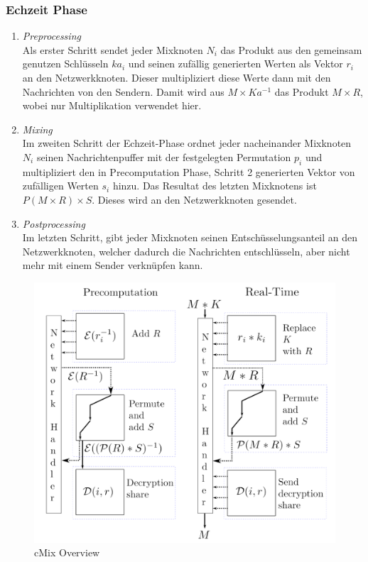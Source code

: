 \documentclass[
    fontsize=12pt,
    headings=small,
    parskip=half,           %
    bibliography=totoc,
    numbers=noenddot,       %
    open=any,               %
    ]{scrreprt}
\begin{document}
\subsubsection{Echzeit Phase}
\begin{enumerate}
	\item \textit{Preprocessing} \\
	Als erster Schritt sendet jeder Mixknoten $N_i$ das Produkt aus den gemeinsam genutzen Schlüsseln $ka_i$ und seinen zufällig generierten Werten als Vektor $r_i$ an den Netzwerkknoten.
Dieser multipliziert diese Werte dann mit den Nachrichten von den Sendern.
Damit wird aus $M \times Ka^{-1}$ das Produkt $M \times R$, wobei nur Multiplikation verwendet hier.
	
	\item \textit{Mixing} \\
	Im zweiten Schritt der Echzeit-Phase ordnet jeder nacheinander Mixknoten $N_i$ seinen Nachrichtenpuffer mit der festgelegten Permutation $p_i$ und multipliziert den in Precomputation Phase, Schritt 2 generierten Vektor von zufälligen Werten $s_i$ hinzu.
Das Resultat des letzten Mixknotens ist $P(M \times R) \times S$.
Dieses wird an den Netzwerkknoten gesendet.

	
	\item \textit{Postprocessing} \\
Im letzten Schritt, gibt jeder Mixknoten seinen Entschüsselungsanteil an den Netzwerkknoten, welcher dadurch die Nachrichten entschlüsseln, aber nicht mehr mit einem Sender verknüpfen kann.
\end{enumerate}




\begin{figure}[h]
\includegraphics[width=0.8
\textwidth]{Bilder/cmix_overview.png}
 \caption{cMix Overview}
\end{figure}
\end{document}
